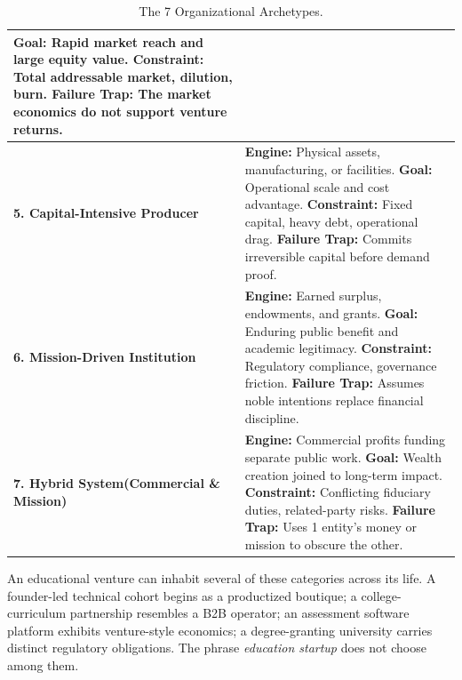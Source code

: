 \begin{table}[htbp]
\begin{tcolorbox}[
  enhanced,
  colback=white,
  colframe=BayesBorder!80!white,
  boxrule=0.4pt,
  arc=2pt,
  left=3pt,right=3pt,top=3pt,bottom=3pt,
  before skip=3pt,after skip=4pt
]
\begin{tabularx}{\linewidth}{@{} >{\bfseries\color{BayesInk}}p{2.3cm} >{\color{BayesInk}}X @{}}
\textbf{Goal:} Rapid market reach and large equity value.\newline
\textbf{Constraint:} Total addressable market, dilution, burn.\newline
\textbf{Failure Trap:} The market economics do not support venture returns. \\
\midrule
5. Capital-Intensive Producer & 
\textbf{Engine:} Physical assets, manufacturing, or facilities.\newline
\textbf{Goal:} Operational scale and cost advantage.\newline
\textbf{Constraint:} Fixed capital, heavy debt, operational drag.\newline
\textbf{Failure Trap:} Commits irreversible capital before demand proof. \\
\midrule
6. Mission-Driven Institution & 
\textbf{Engine:} Earned surplus, endowments, and grants.\newline
\textbf{Goal:} Enduring public benefit and academic legitimacy.\newline
\textbf{Constraint:} Regulatory compliance, governance friction.\newline
\textbf{Failure Trap:} Assumes noble intentions replace financial discipline. \\
\midrule
7. Hybrid System\newline(Commercial \& Mission) & 
\textbf{Engine:} Commercial profits funding separate public work.\newline
\textbf{Goal:} Wealth creation joined to long-term impact.\newline
\textbf{Constraint:} Conflicting fiduciary duties, related-party risks.\newline
\textbf{Failure Trap:} Uses 1 entity's money or mission to obscure the other. \\
\bottomrule
\end{tabularx}
\end{tcolorbox}
\caption{The 7 Organizational Archetypes.}
\label{tab:archetypes}
\end{table}

An educational venture can inhabit several of these categories across its life. A founder-led technical cohort begins as a productized boutique; a college-curriculum partnership resembles a B2B operator; an assessment software platform exhibits venture-style economics; a degree-granting university carries distinct regulatory obligations. The phrase \textit{education startup} does not choose among them.

